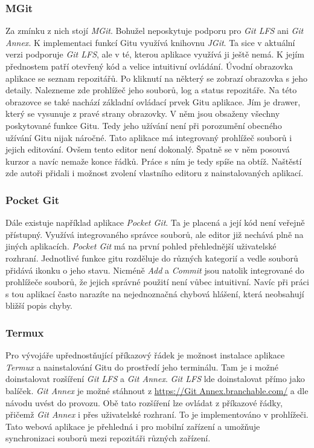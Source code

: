     \subsubsection{MGit}
    Za zmínku z nich stojí \emph{MGit}. Bohužel neposkytuje podporu pro \emph{Git LFS} ani \emph{Git Annex}. K implementaci funkcí Gitu využívá knihovnu \emph{JGit}. Ta sice v aktuální verzi podporuje \emph{Git LFS}, ale v té, kterou aplikace využívá ji ještě nemá. K jejím přednostem patří otevřený kód a velice intuitivní ovládání.
    Úvodní obrazovka aplikace se seznam repozitářů. Po kliknutí na některý se zobrazí obrazovka s jeho detaily. Nalezneme zde prohlížeč jeho souborů, log a status repozitáře. Na této obrazovce se také nachází základní ovládací prvek Gitu aplikace. Jím je drawer, který se vysunuje z pravé strany obrazovky. V něm jsou obsaženy všechny poskytované funkce Gitu. Tedy jeho užívání není při porozumění obecného užívání Gitu nijak náročné. Tato aplikace má integrovaný prohlížeč souborů i jejich editování. Ovšem tento editor není dokonalý. Špatně se v něm posouvá kurzor a navíc nemaže konce řádků. Práce s ním je tedy spíše na obtíž. Naštěstí zde autoři přidali i možnost zvolení vlastního editoru z nainstalovaných aplikací.

    \subsubsection{Pocket Git}
    Dále existuje například aplikace \emph{Pocket Git}. Ta je placená a její kód není veřejně přístupný. Využívá integrovaného správce souborů, ale editor již nechává plně na jiných aplikacích. \emph{Pocket Git} má na první pohled přehlednější uživatelské rozhraní. Jednotlivé funkce gitu rozděluje do různých kategorií a vedle souborů přidává ikonku o jeho stavu. Nicméně \emph{Add} a \emph{Commit} jsou natolik integrované do prohlížeče souborů, že jejich správné použití není vůbec intuitivní. Navíc při práci s tou aplikací často narazíte na nejednoznačná chybová hlášení, která neobsahují bližší popis chyby.

    \subsubsection{Termux}
    Pro vývojáře upřednostňující příkazový řádek je možnost instalace aplikace \emph{Termux} a nainstalování Gitu do prostředí jeho terminálu. Tam je i možné doinstalovat rozšíření \emph{Git LFS} a \emph{Git Annex}. \emph{Git LFS} lde doinstalovat přímo jako balíček. \emph{Git Annex} je možné stáhnout z \url{https://Git Annex.branchable.com/} a dle návodu uvést do provozu. Obě tato rozšíření lze ovládat z příkazové řádky, přičemž \emph{Git Annex} i přes uživatelské rozhraní. To je implementováno v prohlížeči. Tato webová aplikace je přehledná i pro mobilní zařízení a umožňuje synchronizaci souborů mezi repozitáři různých zařízení.

